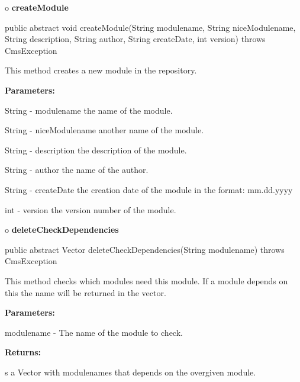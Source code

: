 o {\bf createModule} 

\begin{PRE}
 public abstract void createModule(String modulename,
                                   String niceModulename,
                                   String description,
                                   String author,
                                   String createDate,
                                   int version) throws CmsException
\end{PRE}

\begin{description}
\htmlDD This method creates a new module in the repository. 

\begin{description}
\item {\bf Parameters:}  

String - modulename the name of the module.  

String - niceModulename another name of the module.  

String - description the description of the module.  

String - author the name of the author.  

String - createDate the creation date of the module in the format: mm.dd.yyyy 


int - version the version number of the module.  
\end{description}

\end{description}

o {\bf deleteCheckDependencies} 

\begin{PRE}
 public abstract Vector deleteCheckDependencies(String modulename) throws CmsException
\end{PRE}

\begin{description}
\htmlDD This method checks which modules need this module. If a module depends
on this the name will be returned in the vector. 

\begin{description}
\item {\bf Parameters:}  

modulename - The name of the module to check.  
\item {\bf Returns:}  

s a Vector with modulenames that depends on the overgiven module.  
\end{description}

\end{description}

